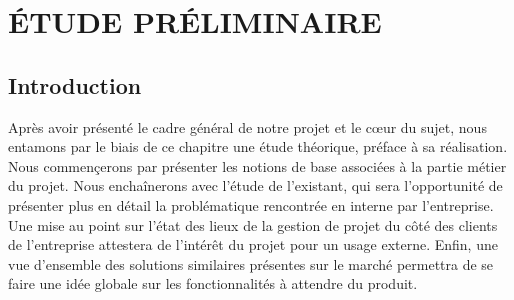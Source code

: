\setcounter{chapter}{1}
\chapter{ÉTUDE PRÉLIMINAIRE}
\minitoc %
\graphicspath{{Chapitre2/figures/}}


\pagestyle{fancy}
\fancyhf{}
\fancyhead[R]{\bfseries\rightmark}
\fancyfoot[R]{\thepage}
\renewcommand{\headrulewidth}{0.5pt}
\renewcommand{\footrulewidth}{0pt}
\renewcommand{\chaptermark}[1]{\markboth{\MakeUppercase{\chaptername~\thechapter. #1 }}{}}
\renewcommand{\sectionmark}[1]{\markright{\thechapter.\thesection~ #1}}

\begin{spacing}{1.5}

\section*{Introduction}
Après avoir présenté le cadre général de notre projet et le cœur du sujet, nous entamons par le biais de ce chapitre une étude théorique, préface à sa réalisation. Nous commençerons par présenter les notions de base associées à la partie métier du projet. Nous enchaînerons avec l'étude de l'existant, qui sera l'opportunité de présenter plus en détail la problématique rencontrée en interne par l'entreprise. Une mise au point sur l'état des lieux de la gestion de projet du côté des clients de l'entreprise attestera de l'intérêt du projet pour un usage externe. Enfin, une vue d'ensemble des solutions similaires présentes sur le marché permettra de se faire une idée globale sur les fonctionnalités à attendre du produit.



\end{spacing}
